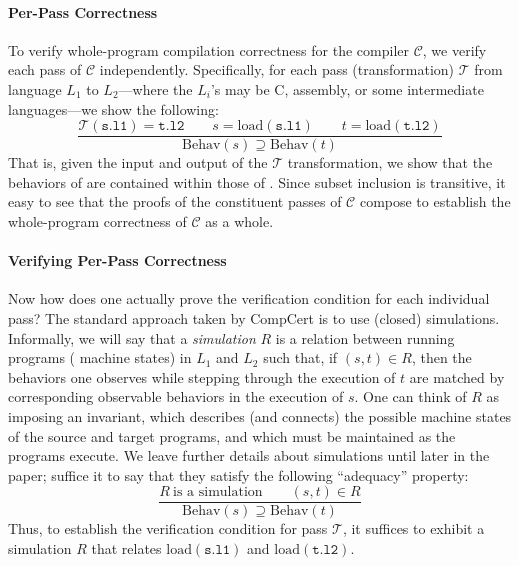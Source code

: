 \paragraph{Per-Pass Correctness}

To verify whole-program compilation correctness for the compiler
$\mathcal{C}$, we verify each pass of $\mathcal{C}$ independently.
Specifically, for each pass (transformation) $\mathcal{T}$ from
language $L_1$ to $L_2$---where the $L_i$'s may be C, assembly, or
some intermediate languages---we show the following:
\[
\frac{
\mathcal{T}(\mathtt{s.l1}) = \mathtt{t.l2} \qquad
s = \mathrm{load}(\mathtt{s.l1}) \qquad
t = \mathrm{load}(\mathtt{t.l2})
}
{
\mathrm{Behav}(s) \supseteq \mathrm{Behav}(t)
}
\]
That is, given the input  and output  of the 
$\mathcal{T}$ transformation, we show that the behaviors of
 are contained within those of .  Since subset
inclusion is transitive, it easy to see that the proofs of the
constituent passes of $\mathcal{C}$ compose to establish the
whole-program correctness of $\mathcal{C}$ as a whole.

\paragraph{Verifying Per-Pass Correctness}
Now how does one actually prove the verification condition for each
individual pass?  The standard approach taken by CompCert is to use
(closed) simulations.  Informally, we will say that a
\emph{simulation} $R$ is a relation between running programs (\ie
machine states) in $L_1$ and $L_2$ such that, if $(s,t) \in R$, then
the behaviors one observes while stepping through the execution of $t$
are matched by corresponding observable behaviors in the execution of
$s$.  One can think of $R$ as imposing an invariant, which describes
(and connects) the possible machine states of the source and target
programs, and which must be maintained as the programs execute.  We
leave further details about simulations until later in the paper;
suffice it to say that they satisfy the following ``adequacy''
property:
\[
\frac{
R~\mbox{is a simulation} \qquad
(s,t)\in R
}{
\mathrm{Behav}(s) \supseteq \mathrm{Behav}(t)
}
\]
Thus, to establish the verification condition for pass $\mathcal{T}$,
it suffices to exhibit a simulation $R$ that relates 
$\mathrm{load}(\mathtt{s.l1})$ and $\mathrm{load}(\mathtt{t.l2})$.

